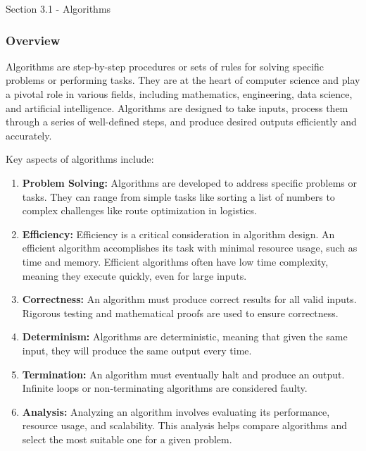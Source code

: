 \begin{notes}{Section 3.1 - Algorithms}
    \subsubsection*{Overview}

    Algorithms are step-by-step procedures or sets of rules for solving specific problems or performing tasks. They are at the heart of computer science and play a pivotal role in various fields, 
    including mathematics, engineering, data science, and artificial intelligence. Algorithms are designed to take inputs, process them through a series of well-defined steps, and produce desired 
    outputs efficiently and accurately. \vspace*{1em}
    
    Key aspects of algorithms include:
    
    \begin{enumerate}
        \item \textbf{Problem Solving:} Algorithms are developed to address specific problems or tasks. They can range from simple tasks like sorting a list of numbers to complex challenges like 
        route optimization in logistics.
    
        \item \textbf{Efficiency:} Efficiency is a critical consideration in algorithm design. An efficient algorithm accomplishes its task with minimal resource usage, such as time and memory. 
        Efficient algorithms often have low time complexity, meaning they execute quickly, even for large inputs.
    
        \item \textbf{Correctness:} An algorithm must produce correct results for all valid inputs. Rigorous testing and mathematical proofs are used to ensure correctness.
    
        \item \textbf{Determinism:} Algorithms are deterministic, meaning that given the same input, they will produce the same output every time.
    
        \item \textbf{Termination:} An algorithm must eventually halt and produce an output. Infinite loops or non-terminating algorithms are considered faulty.
    
        \item \textbf{Analysis:} Analyzing an algorithm involves evaluating its performance, resource usage, and scalability. This analysis helps compare algorithms and select the most suitable 
        one for a given problem.
    

\end{enumerate}
\end{notes}
